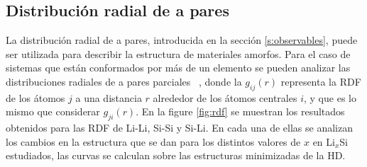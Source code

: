 \subsection{Distribución radial de a pares}

La distribución radial de a pares, introducida en la sección \ref{s:observables},
puede ser utilizada para describir la estructura de materiales amorfos. Para el 
caso de sistemas que están conformados por más de un elemento se pueden analizar 
las distribuciones radiales de a pares parciales ~\cite{lamparter1995}, donde la 
$g_{ij}(r)$ representa la RDF de los átomos $j$ a una distancia $r$ alrededor de 
los átomos centrales $i$, y que es lo mismo que considerar $g_{ji}(r)$. En la 
figure \ref{fig:rdf} se muestran los resultados obtenidos para las RDF de Li-Li, 
Si-Si y Si-Li. En cada una de ellas se analizan los cambios en la estructura que 
se dan para los distintos valores de $x$ en Li$_x$Si estudiados, las curvas se 
calculan sobre las estructuras minimizadas de la HD.

